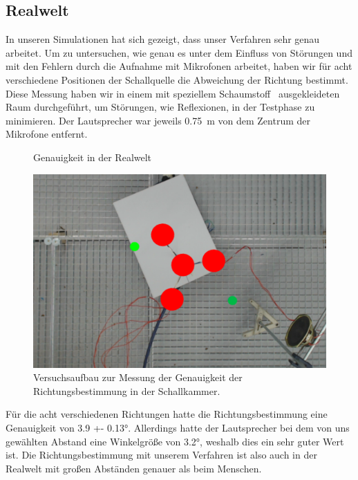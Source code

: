 \subsection{Realwelt}
In unseren Simulationen hat sich gezeigt, dass unser Verfahren sehr genau arbeitet. Um zu untersuchen, wie genau es unter dem Einfluss von Störungen und mit den Fehlern durch die Aufnahme mit Mikrofonen arbeitet, haben wir für acht verschiedene Positionen der Schallquelle die Abweichung der Richtung bestimmt. Diese Messung haben wir in einem mit speziellem Schaumstoff~\cite{BASOTECT} ausgekleideten Raum durchgeführt, um Störungen, wie Reflexionen, in der Testphase zu minimieren. Der Lautsprecher war jeweils \SI{0.75}{\meter} von dem Zentrum der Mikrofone entfernt.
\begin{figure}[H]
\begin{minipage}[b]{0.675\textwidth}
  \centering
  \resizebox{!}{0.675\textwidth}{}
  \caption{Genauigkeit in der Realwelt\label{fig:real}}
\end{minipage}
\hfill
\begin{minipage}[b]{0.3\textwidth}
  \centering
  \includegraphics[width=\textwidth]{img/pos_1}
  \caption{Versuchsaufbau zur Messung der Genauigkeit der Richtungsbestimmung in der Schallkammer.\label{fig:real_reral}}
\end{minipage}
\end{figure}
Für die acht verschiedenen Richtungen hatte die Richtungsbestimmung eine Genauigkeit von \ang[separate-uncertainty = true]{3.9 +- 0.13}. Allerdings hatte der Lautsprecher bei dem von uns gewählten Abstand eine Winkelgröße von \ang{3.2}, weshalb dies ein sehr guter Wert ist. Die Richtungsbestimmung mit unserem Verfahren ist also auch in der Realwelt mit großen Abständen genauer als beim Menschen.
